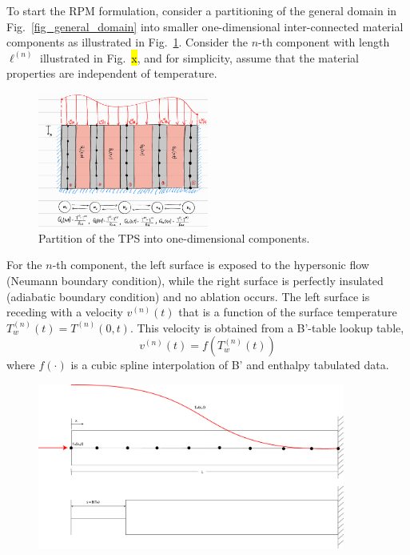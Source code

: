 To start the RPM formulation, consider a partitioning of the general domain in Fig.~\ref{fig_general_domain} into smaller one-dimensional inter-connected material components as illustrated in Fig.~\ref{fig_domain_partition}. Consider the $n$-th component with length $\ell^{(n)}$ illustrated in Fig.~\hl{x}, and for simplicity, assume that the material properties are independent of temperature.

\begin{figure}
    \centering
    \includegraphics[width=0.5\textwidth]{./figs/domain_partition.png}
    \caption{Partition of the TPS into one-dimensional components.}
    \label{fig_domain_partition}
\end{figure}

For the $n$-th component, the left surface is exposed to the hypersonic flow (Neumann boundary condition), while the right surface is perfectly insulated (adiabatic boundary condition) and no ablation occurs. The left surface is receding with a velocity $v^{(n)}(t)$ that is a function of the surface temperature $T^{(n)}_w(t)=T^{(n)}(0,t)$. This velocity is obtained from a B'-table lookup table,
\[
    v^{(n)}(t) = f(T^{(n)}_w(t))
\]
where $f(\cdot)$ is a cubic spline interpolation of B' and enthalpy tabulated data.

\begin{figure}[h]
    \centering
    \includegraphics[width=0.9\textwidth]{./figs/ablation.png}
    \label{fig_ablation_domain}
\end{figure}

